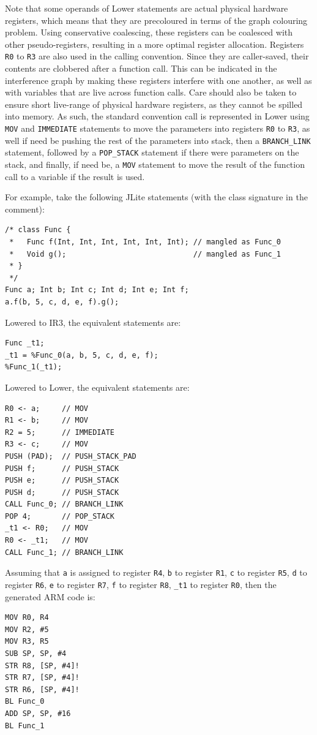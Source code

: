 \documentclass[nonacm, acmsmall, screen, 10pt]{acmart}
\begin{document}
Note that some operands of Lower statements are actual physical hardware registers, which means that they are precoloured in terms of the graph colouring problem.
Using conservative coalescing, these registers can be coalesced with other pseudo-registers, resulting in a more optimal register allocation.
Registers \texttt{R0} to \texttt{R3} are also used in the calling convention.
Since they are caller-saved, their contents are clobbered after a function call.
This can be indicated in the interference graph by making these registers interfere with one another, as well as with variables that are live across function calls.
Care should also be taken to ensure short live-range of physical hardware registers, as they cannot be spilled into memory.
As such, the standard convention call is represented in Lower using \texttt{MOV} and \texttt{IMMEDIATE} statements to move the parameters into registers \texttt{R0} to \texttt{R3}, as well if need be pushing the rest of the parameters into stack, then a \texttt{BRANCH\_LINK} statement, followed by a \texttt{POP\_STACK} statement if there were parameters on the stack, and finally, if need be, a \texttt{MOV} statement to move the result of the function call to a variable if the result is used.

For example, take the following JLite statements (with the class signature in the comment):
\begin{verbatim}
/* class Func {
 *   Func f(Int, Int, Int, Int, Int, Int); // mangled as Func_0
 *   Void g();                             // mangled as Func_1
 * }
 */
Func a; Int b; Int c; Int d; Int e; Int f;
a.f(b, 5, c, d, e, f).g();
\end{verbatim}

Lowered to IR3, the equivalent statements are:
\begin{verbatim}
Func _t1;
_t1 = %Func_0(a, b, 5, c, d, e, f);
%Func_1(_t1);
\end{verbatim}

Lowered to Lower, the equivalent statements are:
\begin{verbatim}
R0 <- a;     // MOV
R1 <- b;     // MOV
R2 = 5;      // IMMEDIATE
R3 <- c;     // MOV
PUSH (PAD);  // PUSH_STACK_PAD
PUSH f;      // PUSH_STACK
PUSH e;      // PUSH_STACK
PUSH d;      // PUSH_STACK
CALL Func_0; // BRANCH_LINK
POP 4;       // POP_STACK
_t1 <- R0;   // MOV
R0 <- _t1;   // MOV
CALL Func_1; // BRANCH_LINK
\end{verbatim}

Assuming that \texttt{a} is assigned to register \texttt{R4}, \texttt{b} to register \texttt{R1}, \texttt{c} to register \texttt{R5}, \texttt{d} to register \texttt{R6}, \texttt{e} to register \texttt{R7}, \texttt{f} to register \texttt{R8}, \texttt{\_t1} to register \texttt{R0}, then the generated ARM code is:
\begin{verbatim}
MOV R0, R4
MOV R2, #5
MOV R3, R5
SUB SP, SP, #4
STR R8, [SP, #4]!
STR R7, [SP, #4]!
STR R6, [SP, #4]!
BL Func_0
ADD SP, SP, #16
BL Func_1
\end{verbatim}
\end{document}
